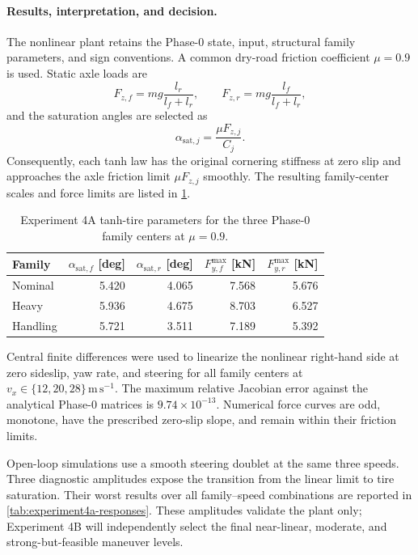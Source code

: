 \paragraph{Results, interpretation, and decision.}
The nonlinear plant retains the Phase-0 state, input, structural family
parameters, and sign conventions. A common dry-road friction coefficient
$\mu=0.9$ is used. Static axle loads are
\begin{equation}
 F_{z,f}=mg\frac{l_r}{l_f+l_r},\qquad
 F_{z,r}=mg\frac{l_f}{l_f+l_r},
\end{equation}
and the saturation angles are selected as
\begin{equation}
 \alpha_{\mathrm{sat},j}=\frac{\mu F_{z,j}}{C_j}.
\end{equation}
Consequently, each tanh law has the original cornering stiffness at zero slip
and approaches the axle friction limit $\mu F_{z,j}$ smoothly. The resulting
family-center scales and force limits are listed in \cref{tab:experiment4a-tires}.

\begin{table}[htbp]
\centering
\caption{Experiment 4A tanh-tire parameters for the three Phase-0 family
centers at $\mu=0.9$.}
\label{tab:experiment4a-tires}
\begin{tabular}{lrrrr}
\toprule
Family & $\alpha_{\mathrm{sat},f}$ [deg] & $\alpha_{\mathrm{sat},r}$ [deg]
& $F_{y,f}^{\max}$ [kN] & $F_{y,r}^{\max}$ [kN]\\
\midrule
Nominal & 5.420 & 4.065 & 7.568 & 5.676\\
Heavy & 5.936 & 4.675 & 8.703 & 6.527\\
Handling & 5.721 & 3.511 & 7.189 & 5.392\\
\bottomrule
\end{tabular}
\end{table}

Central finite differences were used to linearize the nonlinear right-hand side
at zero sideslip, yaw rate, and steering for all family centers at
$v_x\in\{12,20,28\}\,\mathrm{m\,s^{-1}}$. The maximum relative Jacobian error
against the analytical Phase-0 matrices is $9.74\times10^{-13}$. Numerical force
curves are odd, monotone, have the prescribed zero-slip slope, and remain within
their friction limits.

Open-loop simulations use a smooth steering doublet at the same three speeds.
Three diagnostic amplitudes expose the transition from the linear limit to tire
saturation. Their worst results over all family--speed combinations are reported
in \cref{tab:experiment4a-responses}. These amplitudes validate the plant only;
Experiment 4B will independently select the final near-linear, moderate, and
strong-but-feasible maneuver levels.

